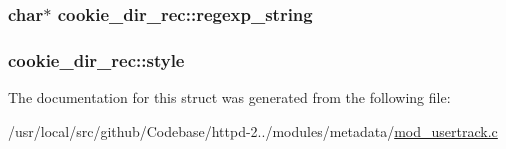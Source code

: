 \subsubsection[{\texorpdfstring{regexp\+\_\+string}{regexp_string}}]{\setlength{\rightskip}{0pt plus 5cm}char$\ast$ cookie\+\_\+dir\+\_\+rec\+::regexp\+\_\+string}\hypertarget{structcookie__dir__rec_aba2cb9d555345c4ca07b4b9f291699d0}{}\label{structcookie__dir__rec_aba2cb9d555345c4ca07b4b9f291699d0}
\subsubsection[{\texorpdfstring{style}{style}}]{ cookie\+\_\+dir\+\_\+rec\+::style}\hypertarget{structcookie__dir__rec_a6c13489550478f02208c0b657bc6a458}{}\label{structcookie__dir__rec_a6c13489550478f02208c0b657bc6a458}


The documentation for this struct was generated from the following file\+:\begin{DoxyCompactItemize}
\item 
/usr/local/src/github/\+Codebase/httpd-\/2../modules/metadata/\hyperlink{mod__usertrack_8c}{mod\+\_\+usertrack.\+c}\end{DoxyCompactItemize}
